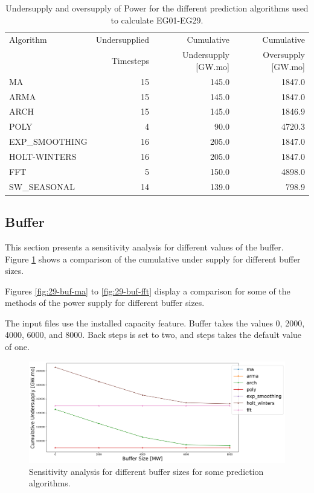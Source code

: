 \documentclass[11pt]{article}
\begin{document}
\begin{table}[H]
	\centering
	\caption{Undersupply and oversupply of Power for the different prediction algorithms used to calculate EG01-EG29.}
	\label{tab:29-power}
	\begin{tabularx}{\textwidth}{lRRR}
		\hline
		Algorithm & Undersupplied & Cumulative  & Cumulative \\
		& Timesteps     & Undersupply [GW.mo]  & Oversupply [GW.mo] \\ \hline
		MA        & 15 	& 145.0 & 1847.0 \\ 
		ARMA      & 15 	& 145.0 & 1847.0 \\ 
		ARCH      & 15 	& 145.0 & 1846.9 \\ 
		POLY      &  4 	& 90.0 & 4720.3 \\ 
		EXP\_SMOOTHING 	& 16 & 205.0 & 1847.0 \\ 
		HOLT-WINTERS  	& 16 & 205.0 & 1847.0 \\ 
		FFT       &  5	& 150.0	& 4898.0 \\ 
		SW\_SEASONAL    & 14 & 139.0 & 798.9 \\ \hline
	\end{tabularx}
\end{table}

\subsection{Buffer}

This section presents a sensitivity analysis for different values of the buffer. Figure \ref{fig:29-buff} shows a comparison of the cumulative under supply for different buffer sizes.

Figures \ref{fig:29-buf-ma} to \ref{fig:29-buf-fft} display a comparison for some of the methods of the power supply for different buffer sizes.

The input files use the installed capacity feature. Buffer takes the values 0, 2000, 4000, 6000, and 8000. Back steps is set to two, and steps takes the default value of one.

\begin{figure}[H]
	\centering
	\includegraphics[width=\textwidth]{29-figures/29-sens-buffer.png} 
	\hfill
	\caption{Sensitivity analysis for different buffer sizes for some prediction algorithms.}
	\label{fig:29-buff}
\end{figure}
\end{document}
